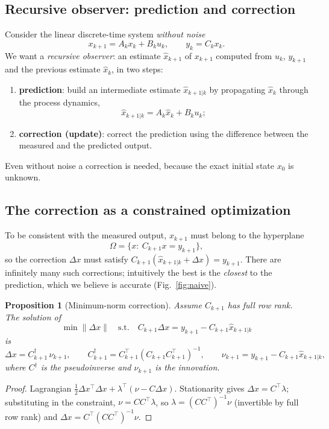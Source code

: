 \documentclass[11pt,a4paper]{article}
\def\boldsymbol#1{#1}%
\def\mathbf#1{#1}%
\newcommand{\tp}{^{\top}}
\newcommand{\pinv}{^{\dagger}}
\newcommand{\hx}{\hat{\boldsymbol{x}}}
\newcommand{\bx}{\boldsymbol{x}}
\newcommand{\bu}{\boldsymbol{u}}
\newcommand{\by}{\boldsymbol{y}}
\newcommand{\bnu}{\boldsymbol{\nu}}
\newcommand{\mA}{\mathbf{A}}
\newcommand{\mB}{\mathbf{B}}
\newcommand{\mC}{\mathbf{C}}
\theoremstyle{definition}
\theoremstyle{plain}
\newtheorem{proposition}[definition]{Proposition}
\theoremstyle{remark}
\begin{document}
\subsection{Recursive observer: prediction and correction}

Consider the linear discrete-time system \emph{without noise}
\begin{equation}\label{eq:lin-nonoise}
\bx_{k+1}=\mA_k\bx_k+\mB_k\bu_k,\qquad \by_k=\mC_k\bx_k .
\end{equation}
We want a \emph{recursive observer}: an estimate $\hx_{k+1}$ of $\bx_{k+1}$ computed from $\bu_k$, $\by_{k+1}$ and the previous
estimate $\hx_k$, in two steps:
\begin{enumerate}
\item \textbf{prediction}: build an intermediate estimate $\hx_{k+1|k}$ by propagating $\hx_k$ through the process dynamics,
\begin{equation}\label{eq:pred0}
\hx_{k+1|k}=\mA_k\hx_k+\mB_k\bu_k ;
\end{equation}
\item \textbf{correction (update)}: correct the prediction using the difference between the measured and the predicted output.
\end{enumerate}
Even without noise a correction is needed, because the exact initial state $\bx_0$ is unknown.

\subsection{The correction as a constrained optimization}

To be consistent with the measured output, $\bx_{k+1}$ must belong to the hyperplane
\begin{equation}\label{eq:Omega}
\Omega=\{\bx:\ \mC_{k+1}\bx=\by_{k+1}\},
\end{equation}
so the correction $\Delta\bx$ must satisfy $\mC_{k+1}(\hx_{k+1|k}+\Delta\bx)=\by_{k+1}$. There are infinitely many such
corrections; intuitively the best is the \emph{closest} to the prediction, which we believe is accurate (Fig.~\ref{fig:naive}).

\begin{proposition}[Minimum-norm correction]\label{prop:minnorm}
Assume $\mC_{k+1}$ has full row rank. The solution of
\[
\min\|\Delta\bx\|\quad\text{s.t.}\quad \mC_{k+1}\Delta\bx=\by_{k+1}-\mC_{k+1}\hx_{k+1|k}
\]
is
\begin{equation}\label{eq:dx0}
\Delta\bx=\mC_{k+1}\pinv\,\bnu_{k+1},\qquad
\mC_{k+1}\pinv=\mC_{k+1}\tp(\mC_{k+1}\mC_{k+1}\tp)^{-1},\qquad
\bnu_{k+1}=\by_{k+1}-\mC_{k+1}\hx_{k+1|k},
\end{equation}
where $\mC\pinv$ is the \emph{pseudoinverse} and $\bnu_{k+1}$ is the \emph{innovation}.
\end{proposition}
\begin{proof}
Lagrangian $\tfrac12\Delta\bx\tp\Delta\bx+\boldsymbol\lambda\tp(\bnu-\mC\Delta\bx)$. Stationarity gives
$\Delta\bx=\mC\tp\boldsymbol\lambda$; substituting in the constraint, $\bnu=\mC\mC\tp\boldsymbol\lambda$, so
$\boldsymbol\lambda=(\mC\mC\tp)^{-1}\bnu$ (invertible by full row rank) and $\Delta\bx=\mC\tp(\mC\mC\tp)^{-1}\bnu$.
\end{proof}
\end{document}
